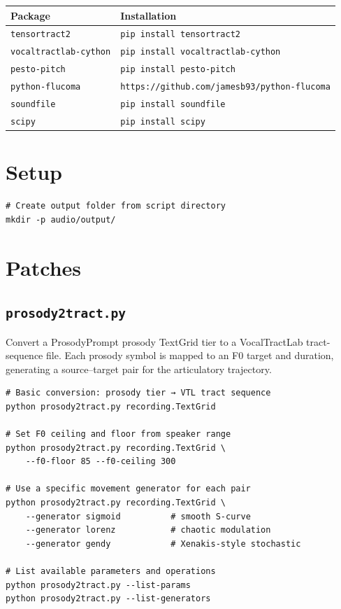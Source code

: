 \medskip

\begin{center}
\small
\begin{tabular}{ll}
\toprule
Package & Installation \\
\midrule
\texttt{tensortract2} & \texttt{pip install tensortract2} \\
\texttt{vocaltractlab-cython} & \texttt{pip install vocaltractlab-cython} \\
\texttt{pesto-pitch} & \texttt{pip install pesto-pitch} \\
\texttt{python-flucoma} & \texttt{https://github.com/jamesb93/python-flucoma} \\
\texttt{soundfile} & \texttt{pip install soundfile} \\
\texttt{scipy} & \texttt{pip install scipy} \\
\bottomrule
\end{tabular}
\end{center}

\section*{Setup}

\begin{verbatim}
# Create output folder from script directory
mkdir -p audio/output/
\end{verbatim}

\section*{Patches}

\subsection*{\texttt{prosody2tract.py}}

Convert a ProsodyPrompt prosody TextGrid tier to a VocalTractLab
tract-sequence file. Each prosody symbol is mapped to an F0 target
and duration, generating a source--target pair for the articulatory
trajectory.

\begin{verbatim}
# Basic conversion: prosody tier → VTL tract sequence
python prosody2tract.py recording.TextGrid

# Set F0 ceiling and floor from speaker range
python prosody2tract.py recording.TextGrid \
    --f0-floor 85 --f0-ceiling 300

# Use a specific movement generator for each pair
python prosody2tract.py recording.TextGrid \
    --generator sigmoid          # smooth S-curve
    --generator lorenz           # chaotic modulation
    --generator gendy            # Xenakis-style stochastic

# List available parameters and operations
python prosody2tract.py --list-params
python prosody2tract.py --list-generators
\end{verbatim}

